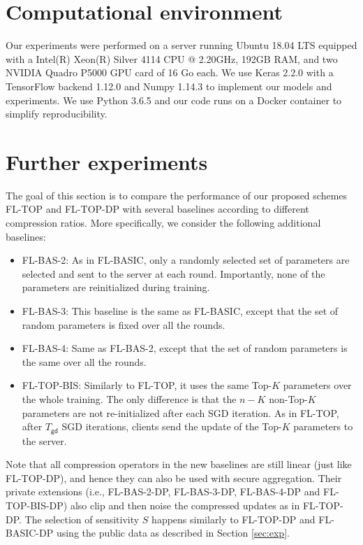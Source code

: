 \documentclass[accepted]{uai2021} %
\newcommand{\Tgd}{T_{\mathsf{gd}}}
\newcommand{\TOPK}{Top-$K$\xspace}
\begin{document}

\section{Computational environment}

Our experiments were performed on a server running Ubuntu 18.04 LTS equipped with a Intel(R) Xeon(R) Silver 4114 CPU @ 2.20GHz, 192GB RAM, and two NVIDIA Quadro P5000 GPU card of 16 Go each. We use Keras 2.2.0 \cite{KERAS} with a TensorFlow  backend 1.12.0 \cite{TensorFlow} and Numpy 1.14.3 \cite{Numpy} to implement our models and experiments. We use  Python 3.6.5 and our code runs on a Docker container to simplify reproducibility. 

\section{Further experiments}
\label{sec:furthmore_experiments}
The goal of this section is to compare the performance of our proposed schemes FL-TOP and FL-TOP-DP with several baselines  according to different compression ratios. 
More specifically, we consider the following additional baselines:
\begin{itemize}
    \item FL-BAS-2: As in FL-BASIC, only a randomly selected set of parameters are selected and sent to the server at each round. Importantly, none of the parameters are reinitialized during training.
    \item FL-BAS-3: This baseline is the same as FL-BASIC, except that the set of random parameters is fixed over all the rounds.
    \item FL-BAS-4: Same as FL-BAS-2, except that the set of random parameters is the same over all the rounds.
    \item FL-TOP-BIS: Similarly to FL-TOP, it uses the same \TOPK parameters over the whole training. The only difference is that the $n-K$ non-\TOPK parameters are not re-initialized after each SGD iteration. As in FL-TOP, after $\Tgd$ SGD iterations, clients send the update of the \TOPK parameters to the server.
\end{itemize}

Note that all compression operators in the new baselines are still linear (just like FL-TOP-DP), and hence they can also be used with secure aggregation. Their private extensions (i.e., FL-BAS-2-DP, FL-BAS-3-DP, FL-BAS-4-DP and FL-TOP-BIS-DP) also clip and then noise the compressed updates as in FL-TOP-DP. The selection of sensitivity $S$ happens similarly to FL-TOP-DP and FL-BASIC-DP using the public data as described in Section \ref{sec:exp}.
\end{document}
